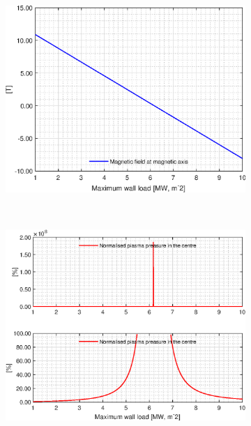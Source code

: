 \begin{figure}[H]
	\begin{subfigure}[h!]{.45\textwidth}
		\includegraphics[width=\textwidth]{MatlabFigures/PW/f7.eps}
	\end{subfigure}
	~
	\begin{subfigure}[h!]{.45\textwidth}
		\includegraphics[width=\textwidth]{MatlabFigures/PW/f8.eps}
	\end{subfigure}
\end{figure}
